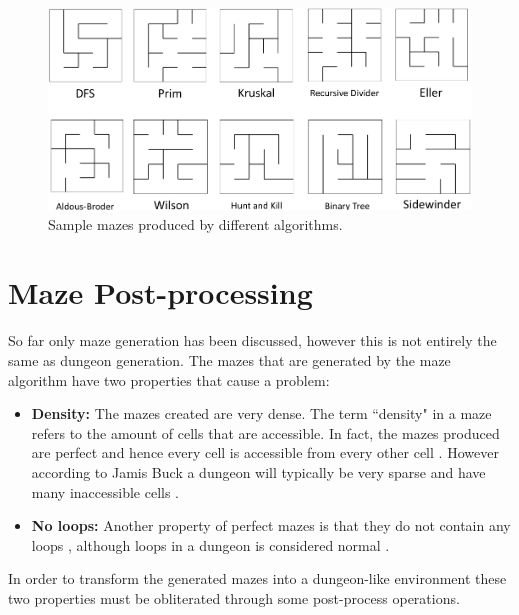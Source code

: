 \begin{figure}[h!]
\centering
 \includegraphics[width=1\textwidth]{images/mazes.png}
\caption{Sample mazes produced by different algorithms.}
\end{figure}


\section{Maze Post-processing}
So far only maze generation has been discussed, however this is not entirely the same as dungeon generation. The mazes that are generated by the maze algorithm have two properties that cause a problem:

\begin{itemize}
\item {\bf Density:} The mazes created are very dense. The term ``density" in a maze refers to the amount of cells that are accessible. In fact, the mazes produced are perfect and hence every cell is accessible from every other cell \citep{ThinkLabyrinth}. However according to Jamis Buck a dungeon will typically be very sparse and have many inaccessible cells \citep{JBuck}.
\item {\bf No loops:} Another property of perfect mazes is that they do not contain any loops \citep{ThinkLabyrinth}, although loops in a dungeon is considered normal \citep{JBuck}.
\end{itemize}

In order to transform the generated mazes into a dungeon-like environment these two properties must be obliterated through some post-process operations.

